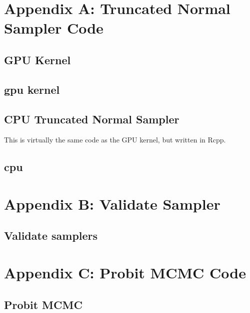 \documentclass[11pt]{amsart}
\newcommand{\prettycode}[2]{
  \hrulefill
  \subsection*{#1}
  
  \vspace{2em}
}
\begin{document}
\section{Appendix A: Truncated Normal Sampler Code}

\subsection{GPU Kernel}
\prettycode{gpu kernel}{../rtruncnorm.cu}
\subsection{CPU Truncated Normal Sampler}
This is virtually the same code as the GPU kernel, but written in Rcpp.
\prettycode{cpu}{../rtruncnorm_cpu.cpp}



\section{Appendix B: Validate Sampler}
\subsection{Validate samplers}
\prettycode{}{../verify_rtruncnorm.r}


\section{Appendix C: Probit MCMC Code}
\subsection{Probit MCMC}
\prettycode{}{../probit_mcmc.r}
\end{document}
